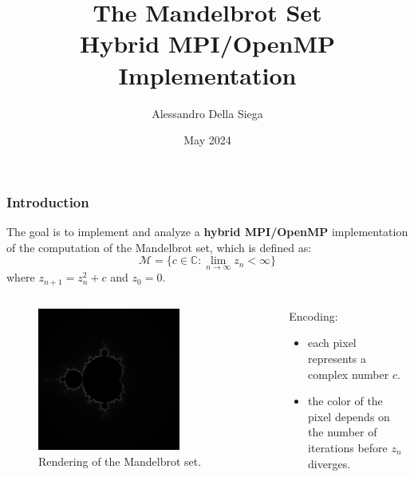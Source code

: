 \documentclass{beamer}
\title{The Mandelbrot Set \\ Hybrid MPI/OpenMP Implementation}
\author{Alessandro Della Siega}
\institute{University of Trieste}
\date{May 2024}
\begin{document}
\frame{\titlepage}



\begin{frame}
    \frametitle{Introduction}

    The goal is to implement and analyze a \textbf{hybrid MPI/OpenMP} implementation of the computation of the Mandelbrot set, which is defined as:
    $$
        \mathcal{M} = \{c \in \mathbb{C} : \lim_{n \to \infty} z_n < \infty \}
    $$
    where $z_{n+1} = z_n^2 + c$ and $z_0 = 0$.

    \begin{columns}
        
        \begin{column}{0.5\textwidth}
            
            \begin{figure}
                \centering
                \includegraphics[width=0.7\textwidth]{../images/mandelbrot.png}
                \caption{Rendering of the Mandelbrot set. } 
            \end{figure}

        \end{column}
        
        \begin{column}{0.5\textwidth}
            Encoding:
            \begin{itemize}
                \item each pixel represents a complex number $c$.
                \item the color of the pixel depends on the number of iterations before $z_n$ diverges.
            \end{itemize}
        \end{column}

    \end{columns}   

\end{frame}
\end{document}
